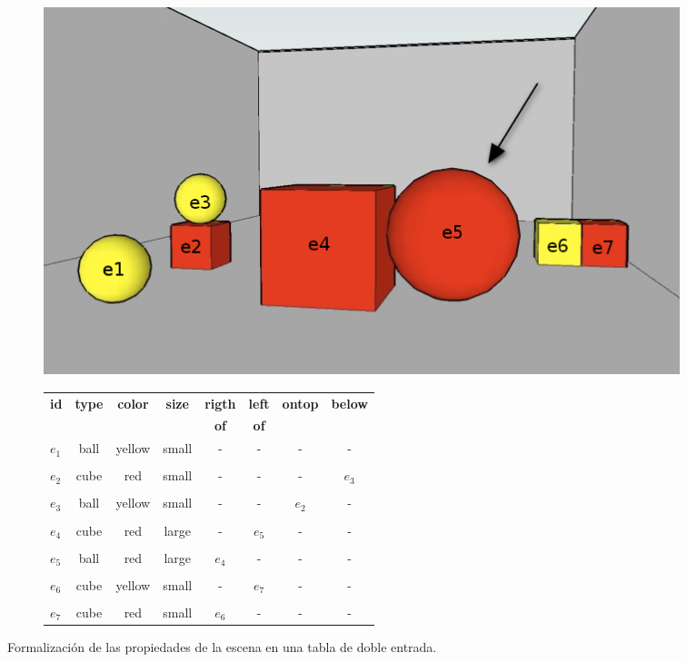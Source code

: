 \begin{figure}[ht]
%
\begin{subfigure}{.48\textwidth}
  \centering
\includegraphics[width=\textwidth]{images/22.jpg}
  \caption{}\label{GRE3D7-stimulus1-ids}
\end{subfigure}
%
\begin{subfigure}{.48\textwidth}
\begin{scriptsize}
\begin{tabular}{|l|c|c|c|c|c|c|c|}
\hline
\textbf {id}& 	\textbf {type}		&	\textbf {color}	&	\textbf {size}& \textbf {rigth} & \textbf {left} & \textbf {ontop}	& \textbf {below}	\\
   	   &  	    			&	    		&	     		&  \textbf {of}   		 &  \textbf {of}	    &  	&  \\
\hline \hline
$e_1$ & ball & yellow & small & - & - & - & - \\
& & & & & & & \\
$e_2$ & cube & red & small & - & - &- & $e_3$ \\
& & & & & & & \\
$e_3$ & ball & yellow & small & - & - & $e_2$ & -\\
& & & & & & & \\
$e_4$ & cube & red & large & - & $e_5$ & - & -\\
& & & & & & & \\
$e_5$ & ball & red & large & $e_4$ & - & - & -\\
& & & & & & & \\
$e_6$ & cube & yellow & small & - & $e_7$ & - & -\\
& & & & & & & \\
$e_7$ & cube & red & small & $e_6$ & - & - & -\\
\hline


\end{tabular}
\end{scriptsize}
\centering \hspace*{-8cm} \caption{}\label{tabla-propiedades}
\end{subfigure}
\caption{Formalizaci\'on de las propiedades de la escena en una tabla de doble entrada.}\label{contexto-tabla-propiedades}
\end{figure}

